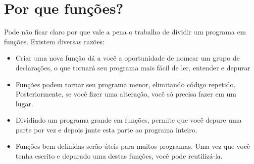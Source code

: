 \section{Por que funções?}


Pode não ficar claro por que vale a pena o trabalho de dividir um programa
em funções. Existem diversas razões:

\begin{itemize}


\item Criar uma nova função dá a você a oportunidade de nomear um grupo de
declarações, o que tornará seu programa mais fácil de ler, entender e
depurar


\item Funções podem tornar seu programa menor, elimitando código repetido.
Posteriormente, se você fizer uma alteração, você só precisa fazer em um
lugar.


\item Dividindo um programa grande em funções, permite que você depure uma
parte por vez e depois junte esta parte ao programa inteiro.


\item Funções bem definidas serão úteis para muitos programas. Uma vez que
você tenha escrito e depurado uma destas funções, você pode reutilizá-la.
\end{itemize}


